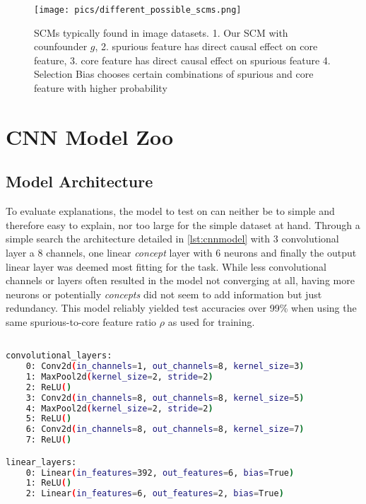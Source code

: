 \begin{figure}[H]
    \centering
    \texttt{[image: pics/different\_possible\_scms.png]}
    \caption{SCMs typically found in image datasets.
        1. Our SCM with counfounder $g$,
        2. spurious feature has direct causal effect on core feature,
        3. core feature has direct causal effect on spurious feature 4. Selection Bias chooses certain combinations of spurious and core feature with higher probability}
    \label{fig:possible_scms}
\end{figure}

\section{CNN Model Zoo}
\subsection{Model Architecture}
To evaluate explanations, the model to test on can neither be to simple and therefore easy to explain, nor too large for the simple dataset at hand.
Through a simple search the architecture detailed in \autoref{lst:cnnmodel} with 3 convolutional layer a 8 channels, one linear \textit{concept} layer with 6 neurons and finally the output linear layer was deemed most fitting for the task. While less convolutional channels or layers often resulted in the model not converging at all, having more neurons or potentially \textit{concepts} did not seem to add information but just redundancy.
This model reliably yielded test accuracies over 99\% when using the same spurious-to-core feature ratio $\rho$ as used for training.

\begin{lstlisting}[language=bash, label=lst:cnnmodel]

convolutional_layers: 
    0: Conv2d(in_channels=1, out_channels=8, kernel_size=3)
    1: MaxPool2d(kernel_size=2, stride=2)
    2: ReLU()
    3: Conv2d(in_channels=8, out_channels=8, kernel_size=5)
    4: MaxPool2d(kernel_size=2, stride=2)
    5: ReLU()
    6: Conv2d(in_channels=8, out_channels=8, kernel_size=7)
    7: ReLU()

linear_layers:
    0: Linear(in_features=392, out_features=6, bias=True)
    1: ReLU()
    2: Linear(in_features=6, out_features=2, bias=True)  

\end{lstlisting}

